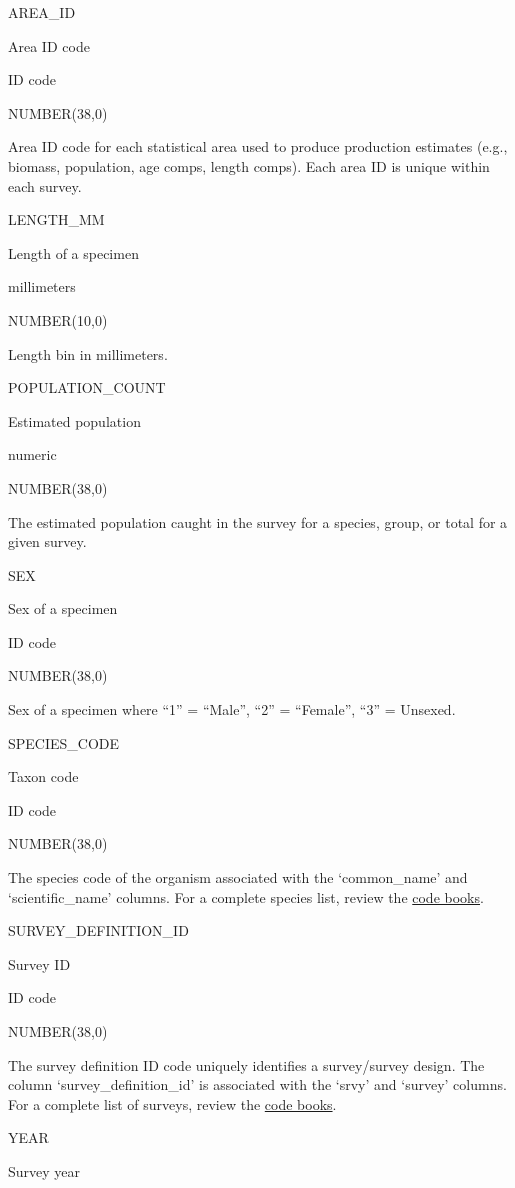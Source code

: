 \documentclass[
  letterpaper,
  oneside,
  open=any]{scrbook}
\begin{document}
AREA\_ID

Area ID code

ID code

NUMBER(38,0)

Area ID code for each statistical area used to produce production
estimates (e.g., biomass, population, age comps, length comps). Each
area ID is unique within each survey.

LENGTH\_MM

Length of a specimen

millimeters

NUMBER(10,0)

Length bin in millimeters.

POPULATION\_COUNT

Estimated population

numeric

NUMBER(38,0)

The estimated population caught in the survey for a species, group, or
total for a given survey.

SEX

Sex of a specimen

ID code

NUMBER(38,0)

Sex of a specimen where ``1'' = ``Male'', ``2'' = ``Female'', ``3'' =
Unsexed.

SPECIES\_CODE

Taxon code

ID code

NUMBER(38,0)

The species code of the organism associated with the `common\_name' and
`scientific\_name' columns. For a complete species list, review the
\href{https://www.fisheries.noaa.gov/resource/document/groundfish-survey-species-code-manual-and-data-codes-manual}{code
books}.

SURVEY\_DEFINITION\_ID

Survey ID

ID code

NUMBER(38,0)

The survey definition ID code uniquely identifies a survey/survey
design. The column `survey\_definition\_id' is associated with the
`srvy' and `survey' columns. For a complete list of surveys, review the
\href{https://www.fisheries.noaa.gov/resource/document/groundfish-survey-species-code-manual-and-data-codes-manual}{code
books}.

YEAR

Survey year
\end{document}
